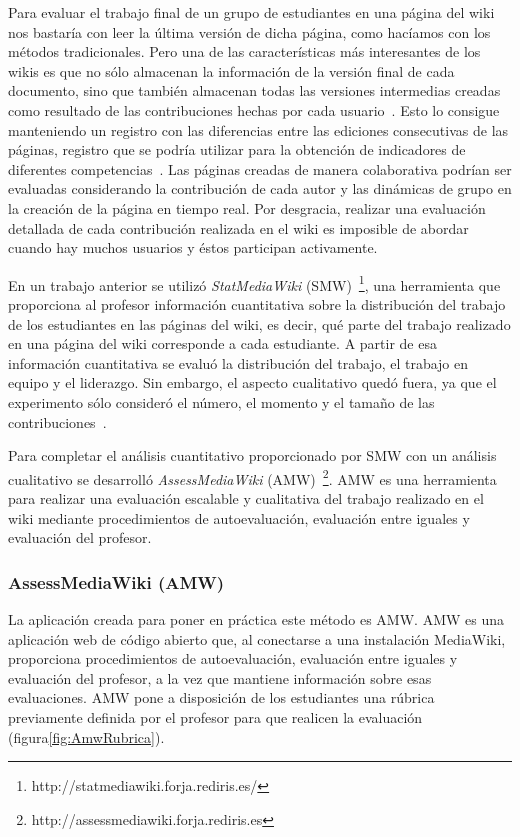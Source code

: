 Para evaluar el trabajo final de un grupo de estudiantes en una página del wiki nos bastaría con leer la última versión de dicha página, como hacíamos con los métodos tradicionales. Pero una de las características más interesantes de los wikis es que no sólo almacenan la información de la versión final de cada documento, sino que también almacenan todas las versiones intermedias creadas como resultado de las contribuciones hechas por cada usuario~\cite{trentin2009using}. Esto lo consigue manteniendo un registro con las diferencias entre las ediciones consecutivas de las páginas, registro que se podría utilizar para la obtención de indicadores de diferentes competencias~\cite{ortega2011new}. Las páginas creadas de manera colaborativa podrían ser evaluadas considerando la contribución de cada autor y las dinámicas de grupo en la creación de la página en tiempo real. Por desgracia, realizar una evaluación detallada de cada contribución realizada en el wiki es imposible de abordar cuando hay muchos usuarios y éstos participan activamente.

En un trabajo anterior se utilizó \emph{StatMediaWiki} (SMW)~\footnote{http://statmediawiki.forja.rediris.es/}, una herramienta que proporciona al profesor información cuantitativa sobre la distribución del trabajo de los estudiantes en las páginas del wiki, es decir, qué parte del trabajo realizado en una página del wiki corresponde a cada estudiante. A partir de esa información cuantitativa se evaluó la distribución del trabajo, el trabajo en equipo y el liderazgo. Sin embargo, el aspecto cualitativo quedó fuera, ya que el experimento sólo consideró el número, el momento y el tamaño de las contribuciones~\cite{palomo2014assessment}.

Para completar el análisis cuantitativo proporcionado por SMW con un análisis cualitativo se desarrolló \emph{AssessMediaWiki} (AMW)~\footnote{http://assessmediawiki.forja.rediris.es}. AMW es una herramienta para realizar una evaluación escalable y cualitativa del trabajo realizado en el wiki mediante procedimientos de autoevaluación, evaluación entre iguales y evaluación del profesor.

\subsubsection{AssessMediaWiki (AMW)}

La aplicación creada para poner en práctica este método es AMW. AMW es una aplicación web de código abierto que, al conectarse a una instalación MediaWiki, proporciona procedimientos de autoevaluación, evaluación entre iguales y evaluación del profesor, a la vez que mantiene información sobre esas evaluaciones. AMW pone a disposición de los estudiantes una rúbrica previamente definida por el profesor para que realicen la evaluación (figura\ref{fig:AmwRubrica}). 

